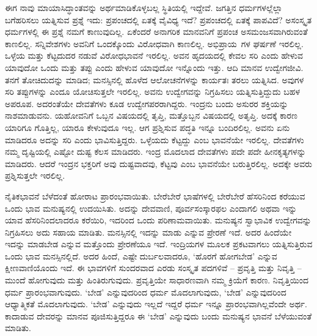 ಈಗ ನಾವು ಮಾಯಾಸಿದ್ಧಾಂತವನ್ನು ಅರ್ಥಮಾಡಿಕೊಳ್ಳಬಲ್ಲ ಸ್ಥಿತಿಯಲ್ಲಿ ಇದ್ದೇವೆ. ಜಗತ್ತಿನ ಧರ್ಮಗಳಲ್ಲೆಲ್ಲಾ ಬಗೆಹರಿಸಲು ಯತ್ನಿಸುವ ಪ್ರಶ್ನೆ ಇದು: ಪ್ರಪಂಚದಲ್ಲಿ ಏತಕ್ಕೆ ವೈವಿಧ್ಯ ಇದೆ? ಪ್ರಪಂಚದಲ್ಲಿ ಏತಕ್ಕೆ ಪಾಪವಿದೆ? ಅಸಂಸ್ಕೃತ ಧರ್ಮಗಳಲ್ಲಿ ಈ ಪ್ರಶ್ನೆ ನಮಗೆ ಕಾಣುವುದಿಲ್ಲ. ಏಕೆಂದರೆ ಅನಾಗರಿಕ ಮಾನವನಿಗೆ ಪ್ರಪಂಚ ಅಸಮಂಜಸವಾಗಿರುವಂತೆ ಕಾಣಲಿಲ್ಲ. ಸನ್ನಿವೇಶಗಳು ಅವನಿಗೆ ಒಂದಕ್ಕೊಂದು ವಿರೋಧವಾಗಿ ಕಾಣಲಿಲ್ಲ. ಅಭಿಪ್ರಾಯ\break\ ಗಳ ಘರ್ಷಣೆ ಇರಲಿಲ್ಲ. ಒಳ್ಳೆಯ ಮತ್ತು ಕೆಟ್ಟದುದರ ನಡುವೆ ವಿರೋಧಭಾವನೆ ಇರಲಿಲ್ಲ. ಅವನ ಹೃದಯದಲ್ಲಿ ಕೇವಲ ಸರಿ ಎಂದು ಹೇಳುವ ಯಾವುದೋ ಒಂದು ಮತ್ತು ತಪ್ಪು ಎಂದು ಹೇಳುವ ಯಾವುದೋ ಇನ್ನೊಂದು ಇತ್ತು. ಆದಿ ಮಾನವ ಉದ್ವೇಗಜೀವಿ. ತನಗೆ ತೋಚಿದುದನ್ನು ಮಾಡಿದ; ಮನಸ್ಸಿನಲ್ಲಿ ಹೊಳೆದ ಆಲೋಚನೆಗಳನ್ನು ಕಾರ್ಯತಃ ತರಲು ಯತ್ನಿಸಿದ. ಅವುಗಳ ಸರಿ ತಪ್ಪುಗಳನ್ನು ಎಂದೂ ಯೋಚಿಸುತ್ತಲೇ ಇರಲಿಲ್ಲ. ಅವನು ಉದ್ವೇಗವನ್ನು ನಿಗ್ರಹಿಸಲು ಯತ್ನಿಸುತ್ತಿದ್ದುದು ಬಹಳ ಅಪರೂಪ. ಅದರಂತೆಯೇ ದೇವತೆಗಳು ಕೂಡ ಉದ್ವೇಗಪರರಾಗಿದ್ದರು. ಇಂದ್ರನು ಬಂದು ಅಸುರರ ಶಕ್ತಿಯನ್ನು ನಾಶಮಾಡುವನು. ಯಹೋವನಿಗೆ ಒಬ್ಬನ ವಿಷಯದಲ್ಲಿ ತೃಪ್ತಿ, ಮತ್ತೊಬ್ಬನ ವಿಷಯದಲ್ಲಿ ಅತೃಪ್ತಿ. ಅದಕ್ಕೆ ಕಾರಣ ಯಾರಿಗೂ ಗೊತ್ತಿಲ್ಲ, ಯಾರೂ ಕೇಳುವುದೂ ಇಲ್ಲ. ಆಗ ಪ್ರಶ್ನಿಸುವ ಪದ್ಧತಿ ಇನ್ನೂ ಬಂದಿರಲಿಲ್ಲ. ಅವನು ಏನು ಮಾಡಿದರೂ ಅದನ್ನು ಸರಿ ಎಂದು ಭಾವಿಸುತ್ತಿದ್ದರು. ಒಳ್ಳೆಯದು ಕೆಟ್ಟದ್ದು ಎಂಬ ಭಾವನೆಯೇ ಇರಲಿಲ್ಲ. ದೇವತೆಗಳು ನಮ್ಮ ದೃಷ್ಟಿಯಲ್ಲಿ ಎಷ್ಟೋ ದುಷ್ಟ ಕೆಲಸ ಮಾಡಿದರು. ಇಂದ್ರ ಮೊದಲಾದ ದೇವತೆಗಳು ಪದೇ ಪದೇ ಹೀನಕೃತ್ಯಗಳನ್ನು ಮಾಡಿದರು. ಆದರೆ ಇಂದ್ರನ ಭಕ್ತರಿಗೆ ಅವು ದುಷ್ಟವಾದವು, ಕೆಟ್ಟವು ಎಂಬ ಭಾವನೆಯೇ ಬರುತ್ತಿರಲಿಲ್ಲ. ಅದಕ್ಕೇ ಅವರು ಪ್ರಶ್ನಿಸುತ್ತಲೇ ಇರಲಿಲ್ಲ.

\newpage

ನೈತಿಕಭಾವನೆ ಬೆಳೆದಂತೆ ಹೋರಾಟ ಪ್ರಾರಂಭವಾಯಿತು. ಬೇರೆಬೇರೆ ಭಾಷೆಗಳಲ್ಲಿ ಬೇರೆಬೇರೆ ಹೆಸರಿನಿಂದ ಕರೆಯುವ ಒಂದು ಭಾವ ಮನುಷ್ಯನಲ್ಲಿ ಉದಯಿಸಿತು. ಅದನ್ನು ದೇವವಾಣಿ, ಪೂರ್ವಸಂಸ್ಕಾರಫಲ ಎಂದಾಗಲಿ ಅಥವಾ ಇನ್ನು ಯಾವ ಹೆಸರಿನಿಂದಲಾದರೂ ಕರೆಯಿರಿ, ಇದರಿಂದ ಒಂದು ಪರಿಣಾಮವಾಯಿತು. ಮನುಷ್ಯನ ಸ್ವಾಭಾವಿಕ ಉದ್ವೇಗವನ್ನು ನಿಗ್ರಹಿಸಲು ಅದು ಸಹಾಯ ಮಾಡಿತು. ಮನಸ್ಸಿನಲ್ಲಿ ಇದನ್ನು ಮಾಡು ಎನ್ನುವ ಪ್ರೇರಣೆ ಇದೆ. ಅದರ ಹಿಂದೆಯೇ ಇದನ್ನು ಮಾಡಬೇಡ ಎನ್ನುವ ಮತ್ತೊಂದು ಪ್ರೇರಣೆಯೂ ಇದೆ. ಇಂದ್ರಿಯಗಳ ಮೂಲಕ ಪ್ರಕಟವಾಗಲು ಯತ್ನಿಸುತ್ತಿರುವ ಒಂದು ಭಾವ ಮನಸ್ಸಿನಲ್ಲಿದೆ. ಅದರ ಹಿಂದೆ, ಎಷ್ಟೇ ದುರ್ಬಲವಾದರೂ, ‘ಹೊರಗೆ ಹೋಗಬೇಡ’ ಎನ್ನುವ ಕ್ಷೀಣವಾಣಿಯೊಂದು ಇದೆ. ಈ ಭಾವಗಳಿಗೆ ಸುಂದರವಾದ ಎರಡು ಸಂಸ್ಕೃತ ಪದಗಳಿವೆ – ಪ್ರವೃತ್ತಿ ಮತ್ತು ನಿವೃತ್ತಿ – ಮುಂದೆ ಹೋಗುವುದು ಮತ್ತು ಹಿಂತಿರುಗುವುದು. ಪ್ರವೃತ್ತಿಯೇ ಸಾಧಾರಣವಾಗಿ ನಮ್ಮ ಕ್ರಿಯೆಗೆ ಕಾರಣ. ನಿವೃತ್ತಿಯಿಂದ ಧರ್ಮ ಪ್ರಾರಂಭವಾಗುವುದು. ‘ಬೇಡ’ ಎನ್ನುವುದರಿಂದ ಧರ್ಮ ಮೊದಲಾಗುವುದು, ‘ಬೇಡ’ ಎನ್ನುವುದರಿಂದ ಆಧ್ಯಾತ್ಮಿಕತೆ ಮೊದಲಾಗುವುದು. ‘ಬೇಡ’ ಎನ್ನುವುದು ಇಲ್ಲದೆ ಇದ್ದರೆ ಧರ್ಮ ಇನ್ನೂ ಪ್ರಾರಂಭವಾಗಿಲ್ಲವೆಂದೇ ಅರ್ಥ. ಕಾದಾಡುವ ದೇವರನ್ನು ಮಾನವ ಪೂಜಿಸುತ್ತಿದ್ದರೂ ಈ ‘ಬೇಡ’ ಎನ್ನುವುದು ಬಂದು ಮನುಷ್ಯನ ಭಾವನೆ ಬೆಳೆಯುವಂತೆ ಮಾಡಿತು.

